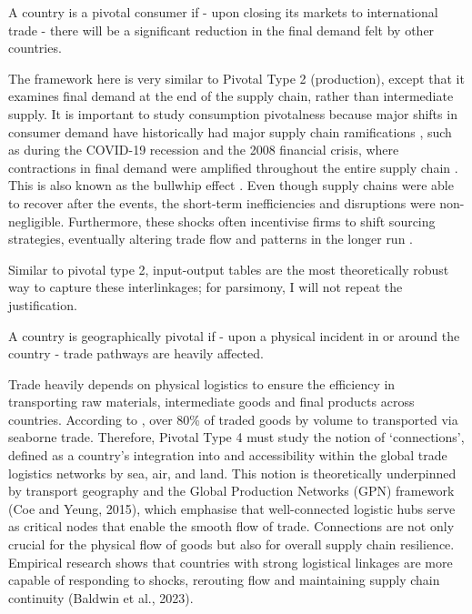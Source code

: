 \documentclass[11pt]{article}
\def\highlight#1#2{
	\begin{centering}
    
		\vspace{1.2ex}
		\begin{minipage}{0.8\linewidth}
			\begin{tcolorbox}[
				boxsep=3.3pt,
				boxrule=0.4pt,
				colback=white,
				colbacktitle=white,
				coltitle=black,
				colframe=black,
				title=\centering \textbf{#1},
			]
				\centering
				#2
			\end{tcolorbox}
		\end{minipage}
		\vspace{1.2ex}
        
	\end{centering}
}
\begin{document}
\highlight{Pivotal Type 3: Consumption}{A country is a pivotal consumer if - upon closing its markets to international trade - there will be a significant reduction in the final demand felt by other countries.}

The framework here is very similar to Pivotal Type 2 (production), except that it examines final demand at the end of the supply chain, rather than intermediate supply. It is important to study consumption pivotalness because major shifts in consumer demand have historically had major supply chain ramifications \citep{fernandez2019}, such as during the COVID-19 recession and the 2008 financial crisis, where contractions in final demand were amplified throughout the entire supply chain \citep{baldwin2009}. This is also known as the bullwhip effect \citep{lee1997}. Even though supply chains were able to recover after the events, the short-term inefficiencies and disruptions were non-negligible. Furthermore, these shocks often incentivise firms to shift sourcing strategies, eventually altering trade flow and patterns in the longer run \citep{ferrari2025}.
 
Similar to pivotal type 2, input-output tables are the most theoretically robust way to capture these interlinkages; for parsimony, I will not repeat the justification.


\highlight{Pivotal Type 4: Geographic}{A country is geographically pivotal if - upon a physical incident in or around the country - trade pathways are heavily affected.}

Trade heavily depends on physical logistics to ensure the efficiency in transporting raw materials, intermediate goods and final products across countries. According to \citet{unctad2023}, over 80\% of traded goods by volume to transported via seaborne trade. Therefore, Pivotal Type 4 must study the notion of ‘connections’, defined as a country’s integration into and accessibility within the global trade logistics networks by sea, air, and land. This notion is theoretically underpinned by transport geography \citep{rodrigue2012,hesse2020} and the Global Production Networks (GPN) framework (Coe and Yeung, 2015), which emphasise that well-connected logistic hubs serve as critical nodes that enable the smooth flow of trade. Connections are not only crucial for the physical flow of goods but also for overall supply chain resilience. Empirical research shows that countries with strong logistical linkages are more capable of responding to shocks, rerouting flow and maintaining supply chain continuity (Baldwin et al., 2023). 
\end{document}
